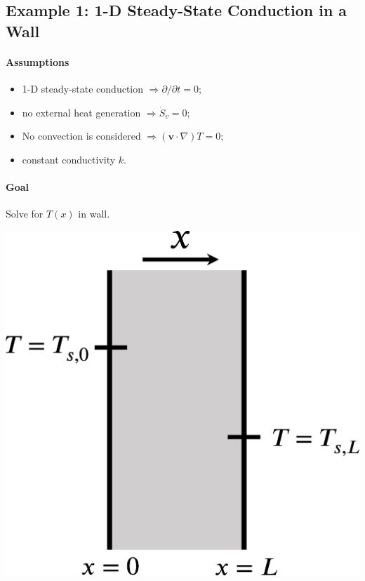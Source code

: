 \documentclass[12pt, a4paper]{article}
\begin{document}
\subsection{Example 1: 1-D Steady-State Conduction in a Wall}
\begin{tcolorbox}[breakable, title = \textbf{Example: 1-D Steady-State Conduction}]
\begin{minipage}{.6\textwidth}
    \paragraph{Assumptions} 
    \begin{itemize}
        \item 1-D steady-state conduction $\Rightarrow \partial / \partial t = 0$;
        \item no external heat generation $ \Rightarrow \dot{S}_{v} = 0$;
        \item No convection is considered $\Rightarrow (\bm{v} \cdot \nabla) T = 0$;
        \item constant conductivity $k$.
\end{itemize}
\paragraph{Goal} Solve for $T(x)$ in wall.
\end{minipage}
\hfill
\begin{minipage}{.35\textwidth}
    \includegraphics[width=.9\textwidth]{img/oneD_conduction_wall.eps}
\end{minipage}
\ \\

\end{tcolorbox}
\end{document}
